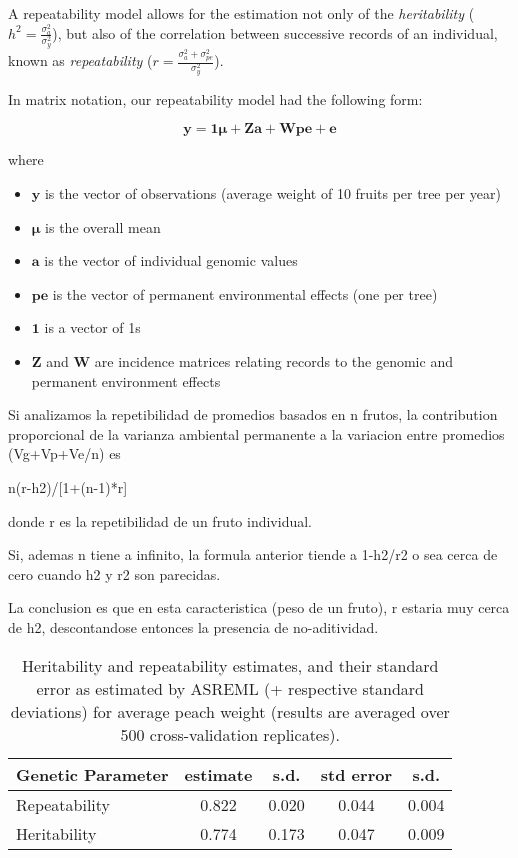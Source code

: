 \documentclass[english,11pt,a4paper]{scrartcl}
\begin{document}
A repeatability model allows for the estimation not only of the
\emph{heritability} ($h^2=\frac{\sigma^2_a}{\sigma^2_y}$), but also of the
correlation between successive records of an individual, known as
\emph{repeatability} ($r=\frac{\sigma^2_a+\sigma^2_{pe}}{\sigma^2_y}$). 

In matrix notation, our repeatability model had the following form:

\begin{equation}
\boldsymbol{y}=\boldsymbol{1\mu}+\boldsymbol{Za}+\boldsymbol{Wpe}+\boldsymbol{e}
\end{equation}

where
{\renewcommand\labelitemi{}
\begin{itemize}
\item $\boldsymbol{y}$ is the vector of observations (average weight of 10
  fruits per tree per year)
\item $\boldsymbol{\mu}$ is the overall mean
\item $\boldsymbol{a}$ is the vector of individual genomic values
\item $\boldsymbol{pe}$ is the vector of permanent environmental effects
  (one per tree)
\item $\boldsymbol{1}$ is a vector of 1s
\item $\boldsymbol{Z}$ and $\boldsymbol{W}$ are incidence matrices relating
  records to the genomic and permanent environment effects
\end{itemize}
}


Si analizamos la repetibilidad de promedios basados en n frutos, la contribution proporcional de la varianza ambiental permanente a la variacion entre promedios (Vg+Vp+Ve/n) es

n(r-h2)/[1+(n-1)*r]

donde r es la repetibilidad de un fruto individual.

Si, ademas n tiene a infinito, la formula anterior tiende a 1-h2/r2 o sea cerca de cero cuando h2 y r2 son parecidas.

La conclusion es que en esta caracteristica (peso de un fruto), r
estaria muy cerca de h2, descontandose entonces la presencia de
no-aditividad.

\begin{table}
\centering
\begin{tabular}{l c c c c}
Genetic Parameter & estimate & s.d. & std error & s.d. \\
\hline
Repeatability & 0.822 & 0.020 & 0.044 & 0.004 \\
Heritability & 0.774 & 0.173 & 0.047 & 0.009 \\
\end{tabular}
\caption{Heritability and repeatability estimates, and their standard
  error as estimated by ASREML (+ respective standard
  deviations) for average peach weight (results are averaged over 500 cross-validation replicates).}
\label{tab:repeatability}
\end{table}


\pagebreak



\end{document}
